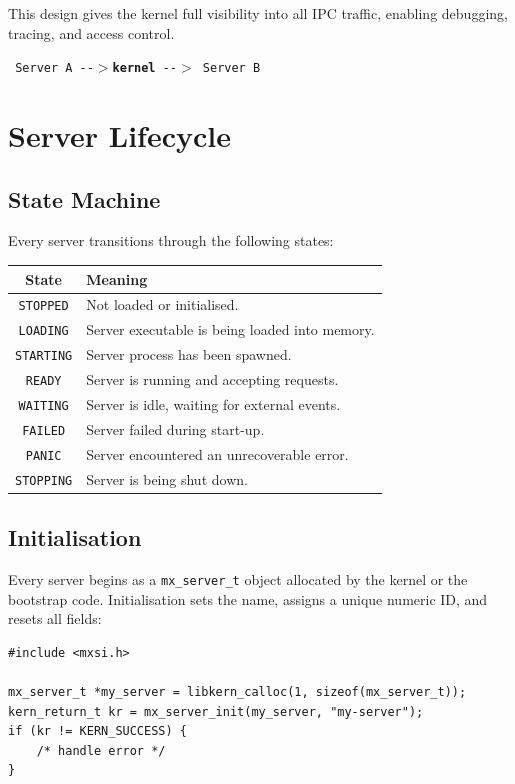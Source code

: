 \documentclass[a4paper,11pt]{article}
\begin{document}
This design gives the kernel full visibility into all IPC traffic,
enabling debugging, tracing, and access control.

\begin{center}
\texttt{\small
  Server A -\hbox{-}$>${\bf kernel} -\hbox{-}$>$ Server B
}
\end{center}

\section{Server Lifecycle}

\subsection{State Machine}

Every server transitions through the following states:

\begin{center}
\begin{tabularx}{\textwidth}{|c|X|}
\hline
\textbf{State} & \textbf{Meaning} \\
\hline
\texttt{STOPPED}  & Not loaded or initialised. \\
\texttt{LOADING}  & Server executable is being loaded into memory. \\
\texttt{STARTING} & Server process has been spawned. \\
\texttt{READY}    & Server is running and accepting requests. \\
\texttt{WAITING}  & Server is idle, waiting for external events. \\
\texttt{FAILED}   & Server failed during start-up. \\
\texttt{PANIC}    & Server encountered an unrecoverable error. \\
\texttt{STOPPING} & Server is being shut down. \\
\hline
\end{tabularx}
\end{center}

\subsection{Initialisation}

Every server begins as a \texttt{mx\_server\_t} object allocated by
the kernel or the bootstrap code. Initialisation sets the name,
assigns a unique numeric ID, and resets all fields:

\begin{lstlisting}
#include <mxsi.h>

mx_server_t *my_server = libkern_calloc(1, sizeof(mx_server_t));
kern_return_t kr = mx_server_init(my_server, "my-server");
if (kr != KERN_SUCCESS) {
    /* handle error */
}
\end{lstlisting}
\end{document}
